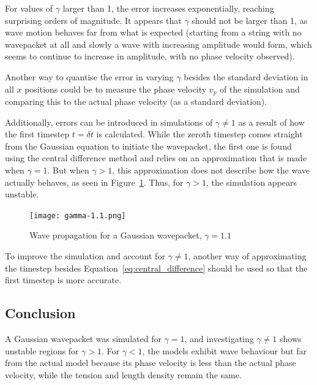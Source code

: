 \documentclass[hyphens,twocolumn,nobalancelastpage,aps,10pt,citeautoscript,longbibliography]{revtex4-2}
\begin{document}
For values of $\gamma$ larger than 1, the error increases exponentially,
reaching surprising orders of magnitude. It appears that $\gamma$ should not be
larger than 1, as wave motion behaves far from what is expected (starting from
a string with no wavepacket at all and slowly a wave with increasing amplitude
would form, which seems to continue to increase in amplitude, with no phase
velocity observed).

Another way to quantise the error in varying $\gamma$ besides the standard
deviation in all $x$ positions could be to measure the phase velocity $v_p$ of
the simulation and comparing this to the actual phase velocity (as a standard
deviation).

Additionally, errors can be introduced in simulations of $\gamma \neq 1$ as a
result of how the first timestep $t = \delta t$ is calculated. While the zeroth
timestep comes straight from the Gaussian equation to initiate the wavepacket,
the first one is found using the central difference method and relies on an
approximation that is made when $\gamma = 1$. But when $\gamma > 1$, this
approximation does not describe how the wave actually behaves, as seen in
Figure~\ref{fig:gamma-1.1}. Thus, for $\gamma > 1$, the simulation appears
unstable.
\begin{figure}[htpb]
	\centering
	\texttt{[image: gamma-1.1.png]}
	\caption{Wave propagation for a Gaussian wavepacket, $\gamma = 1.1$}%
	\label{fig:gamma-1.1}
\end{figure}

To improve the simulation and account for $\gamma \neq 1$, another way of
approximating the timestep besides Equation~\ref{eq:central_difference} should
be used so that the first timestep is more accurate.

\subsection{Conclusion}%
\label{sub:conclusion_2}

\noindent A Gaussian wavepacket was simulated for $\gamma = 1$, and
investigating $\gamma \neq 1$ shows unstable regions for $\gamma > 1$. For
$\gamma < 1$, the models exhibit wave behaviour but far from the actual model
because its phase velocity is less than the actual phase velocity, while the
tension and length density remain the same.
\end{document}
